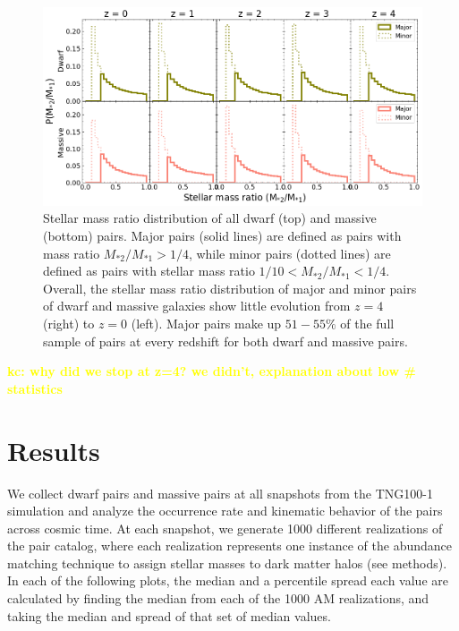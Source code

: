 \documentclass[twocolumn]{aastex631}
\newcommand{\kc}[1]{\textcolor{yellow}{\textbf{kc: #1}} }
\newcommand{\ms}[1]{\ensuremath{M_{*{#1}}}}
\begin{document}
  \begin{figure}[htb]
    \centering
    \includegraphics[width=\textwidth]{stellarmass_distribution_1000.png}
    \caption{Stellar mass ratio distribution of all dwarf (top) and massive (bottom) pairs. Major pairs (solid lines) are defined as pairs with mass ratio $\ms{2}/\ms{1} > 1/4$, while minor pairs (dotted lines) are defined as pairs with stellar mass ratio $1/10<\ms{2}/\ms{1}<1/4$. Overall, the stellar mass ratio distribution of major and minor pairs of dwarf and massive galaxies show little evolution from $z=4$ (right) to $z=0$ (left). 
    Major pairs make up $51-55\%$ of the full sample of pairs at every redshift for both dwarf and massive pairs.}
    \label{fig:massratio}
  \end{figure}



\kc{why did we stop at z=4? we didn't, explanation about low \# statistics }


\section{Results}
We collect dwarf pairs and massive pairs at all snapshots from the TNG100-1 simulation and analyze the occurrence rate and kinematic behavior of the pairs across cosmic time. 
At each snapshot, we generate 1000 different realizations of the pair catalog, where each realization represents one instance of the abundance matching technique to assign stellar masses to dark matter halos (see methods). 
In each of the following plots, the median and a percentile spread each value are calculated by finding the median from each of the 1000 AM realizations, and taking the median and spread of that set of median values.
\end{document}
